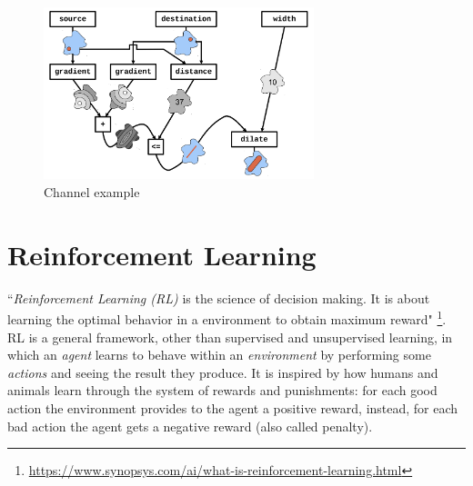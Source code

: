 \documentclass[12pt,a4paper,openright,twoside]{book}
\begin{document}
\begin{figure}[h!]
    \centering
    \includegraphics[width=0.7\textwidth]{figures/channel.png}
    \caption{Channel example}
    \label{fig:channel}
\end{figure}



%
\section{Reinforcement Learning}
%

``\emph{Reinforcement Learning (RL)} is the science of decision making. It is about learning the optimal behavior 
    in a environment to obtain maximum reward" 
    \footnote{\url{https://www.synopsys.com/ai/what-is-reinforcement-learning.html}}.
    RL is a general framework, other than supervised and unsupervised learning, in which an \emph{agent} learns 
    to behave within an \emph{environment} by performing some \emph{actions} and seeing the result they produce.
    It is inspired by how humans and animals learn through the system of rewards and punishments: for each good action
    the environment provides to the agent a positive reward, instead, for each bad action the agent gets a negative 
    reward (also called penalty).
\end{document}
